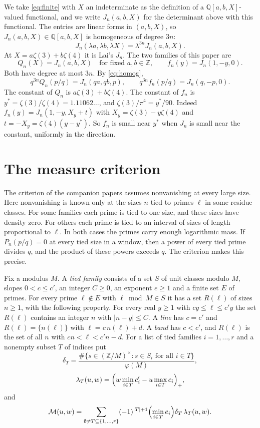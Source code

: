 \documentclass[11pt]{amsart}
\theoremstyle{definition}
\theoremstyle{remark}
\numberwithin{equation}{section}
\newcommand{\Z}{\mathbb Z}
\newcommand{\Q}{\mathbb Q}
\newcommand{\cM}{\mathcal M}
\begin{document}
We take \eqref{eq:finite} with $X$ an indeterminate as the definition of a $\Q[a,b,X]$-valued functional, and we write
$J_n(a,b,X)$ for the determinant above with this functional. The entries are linear forms in $(a,b,X)$, so
$J_n(a,b,X)\in\Q[a,b,X]$ is homogeneous of degree $3n$:
\begin{equation}\label{eq:homog}
 J_n(\lambda a,\lambda b,\lambda X)=\lambda^{3n}J_n(a,b,X).
\end{equation}
At $X=a\zeta(3)+b\zeta(4)$ it is Lai's $J_n$. The two families of this paper are
\[
 Q_n(X)=J_n(a,b,X)\quad\text{for fixed }a,b\in\Z,\qquad f_n(y)=J_n(1,-y,0).
\]
Both have degree at most $3n$. By \eqref{eq:homog},
\begin{equation}\label{eq:scaled}
 q^{3n}Q_n(p/q)=J_n(qa,qb,p),\qquad q^{3n}f_n(p/q)=J_n(q,-p,0).
\end{equation}
The constant of $Q_n$ is $a\zeta(3)+b\zeta(4)$. The constant of $f_n$ is $y^*=\zeta(3)/\zeta(4)=1.11062\ldots$, and
$\zeta(3)/\pi^4=y^*/90$. Indeed $f_n(y)=J_n(1,-y,X_y+t)$ with $X_y=\zeta(3)-y\zeta(4)$ and $t=-X_y=\zeta(4)(y-y^*)$.
So $f_n$ is small near $y^*$ when $J_n$ is small near the constant, uniformly in the direction.

\section{The measure criterion}\label{sec:criterion}

The criterion of the companion papers \cite{Litsey2026,Litsey2026c} assumes nonvanishing at every large size. Here
nonvanishing is known only at the sizes $n$ tied to primes $\ell$ in some residue classes. For some families each
prime is tied to one size, and these sizes have density zero. For others each prime is tied to an interval of sizes
of length proportional to $\ell$. In both cases the primes carry enough logarithmic mass. If $P_n(p/q)=0$ at every tied
size in a window, then a power of every tied prime divides $q$, and the product of these powers exceeds $q$. The
criterion makes this precise.

Fix a modulus $M$. A \emph{tied family} consists of a set $S$ of unit classes modulo $M$, slopes
$0<c\le c'$, an integer $C\ge0$, an exponent $e\ge1$ and a finite set $E$ of primes. For every prime $\ell\notin E$
with $\ell\bmod M\in S$ it has a set $R(\ell)$ of sizes $n\ge1$, with the following property. For every real
$y\ge1$ with $cy\le\ell\le c'y$ the set $R(\ell)$ contains an integer $n$ with $|n-y|\le C$. A \emph{line} has $c=c'$ and
$R(\ell)=\{n(\ell)\}$ with $\ell=c\,n(\ell)+d$. A \emph{band} has $c<c'$, and $R(\ell)$ is the set of all $n$ with
$cn<\ell<c'n-d$. For a list of tied families $i=1,\dots,r$ and a nonempty subset $T$ of
indices put
\[
 \delta_T=\frac{\#\{s\in(\Z/M)^\times:s\in S_i\text{ for all }i\in T\}}{\varphi(M)},
\]
\[
 \lambda_T(u,w)=\Bigl(w\min_{i\in T}c'_i-u\max_{i\in T}c_i\Bigr)_+,
\]
and
\[
 \cM(u,w)=\sum_{\emptyset\ne T\subseteq\{1,\dots,r\}}(-1)^{|T|+1}\Bigl(\min_{i\in T}e_i\Bigr)\delta_T\,\lambda_T(u,w).
\]
\end{document}
